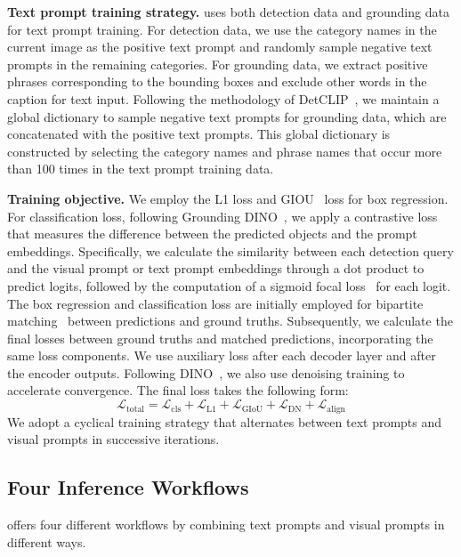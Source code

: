 \noindent\textbf{Text prompt training strategy.} \ourmodel{} uses both detection data and grounding data for text prompt training. For detection data, we use the category names in the current image as the positive text prompt and randomly sample negative text prompts in the remaining categories. For grounding data, we extract positive phrases corresponding to the bounding boxes and exclude other words in the caption for text input. Following the methodology of DetCLIP~\cite{yao2022detclip, yao2023detclipv2}, we maintain a global dictionary to sample negative text prompts for grounding data, which are concatenated with the positive text prompts. This global dictionary is constructed by selecting the category names and phrase names that occur more than 100 times in the text prompt training data. 

\noindent\textbf{Training objective.} We employ the L1 loss and GIOU~\cite{rezatofighi2019generalized} loss for box regression. For classification loss, following Grounding DINO~\cite{liu2023grounding}, we apply a contrastive loss that measures the difference between the predicted objects and the prompt embeddings. Specifically, we calculate the similarity between each detection query and the visual prompt or text prompt embeddings through a dot product to predict logits, followed by the computation of a sigmoid focal loss~\cite{lin2017focal} for each logit. The box regression and classification loss are initially employed for bipartite matching~\cite{carion2020end} between predictions and ground truths. Subsequently, we calculate the final losses between ground truths and matched predictions, incorporating the same loss components. We use auxiliary loss after each decoder layer and after the encoder outputs. Following DINO~\cite{zhang2022dino}, we also use denoising training to accelerate convergence. The final loss takes the following form:
\begin{equation}
\mathcal{L}_{\text{total}} = \mathcal{L}_{\text{cls}} + \mathcal{L}_{\text{L1}} + \mathcal{L}_{\text{GIoU}} + \mathcal{L}_{\text{DN}} + \mathcal{L}_{\text{align}}
\end{equation}
We adopt a cyclical training strategy that alternates between text prompts and visual prompts in successive iterations.

\subsection{Four Inference Workflows}
\ourmodel{} offers four different workflows by combining text prompts and visual prompts in different ways.

